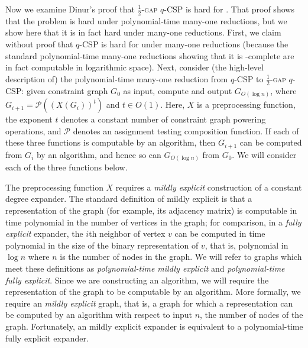 \documentclass{article}
\begin{document}
Now we examine Dinur's proof that \textsc{$\frac{1}{2}$-gap $q$-CSP} is hard for \NP{} \autocite{dinur07}.
That proof shows that the problem is hard under polynomial-time many-one reductions, but we show here that it is in fact hard under \NC{} many-one reductions.
First, we claim without proof that \textsc{$q$-CSP} is hard for \NP{} under \NC{} many-one reductions (because the standard polynomial-time many-one reductions showing that it is \NP-complete are in fact computable in logarithmic space).
Next, consider (the high-level description of) the polynomial-time many-one reduction from \textsc{$q$-CSP} to \textsc{$\frac{1}{2}$-gap $q$-CSP}: given constraint graph $G_0$ as input, compute and output $G_{O(\log n)}$, where $G_{i + 1} = \mathcal{P}({\left(X(G_i)\right)}^t)$ and $t \in O(1)$.
Here, $X$ is a preprocessing function, the exponent $t$ denotes a constant number of constraint graph powering operations, and $\mathcal{P}$ denotes an assignment testing composition function.
If each of these three functions is computable by an \NC{} algorithm, then $G_{i + 1}$ can be computed from $G_i$ by an \NC{} algorithm, and hence so can $G_{O(\log n)}$ from $G_0$.
We will consider each of the three functions below.

The preprocessing function $X$ requires a \emph{mildly explicit} construction of a constant degree expander.
The standard definition of mildly explicit is that a representation of the graph (for example, its adjacency matrix) is computable in time polynomial in the number of vertices in the graph; for comparison, in a \emph{fully explicit} expander, the $i$th neighbor of vertex $v$ can be computed in time polynomial in the size of the binary representation of $v$, that is, polynomial in $\log n$ where $n$ is the number of nodes in the graph.
We will refer to graphs which meet these definitions as \emph{polynomial-time mildly explicit} and \emph{polynomial-time fully explicit}.
Since we are constructing an \NC{} algorithm, we will require the representation of the graph to be computable by an \NC{} algorithm.
More formally, we require an \emph{\NC{} mildly explicit} graph, that is, a graph for which a representation can be computed by an \NC{} algorithm with respect to input $n$, the number of nodes of the graph.
Fortunately, an \NC{} mildly explicit expander is equivalent to a polynomial-time fully explicit expander.
\end{document}
